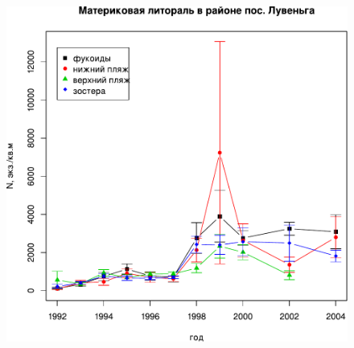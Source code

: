 \begin{figure}[p]
\begin{minipage}[b]{.49\linewidth}
\begin{center}
	\end{center}
	\end{minipage}
	\begin{minipage}[b]{.49\linewidth}
	\begin{center}
		\includegraphics[width=\linewidth]{../White_Sea//Luvenga_II_razrez/N2_dynamic1.pdf}
	\end{center}
	\end{minipage}
%
	\hfil %
%
	\begin{minipage}[b]{.49\linewidth}
	\begin{center}

\end{center}
\end{minipage}
\end{figure}
